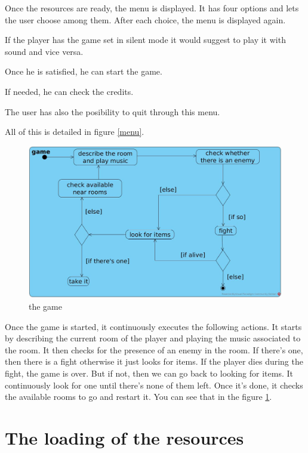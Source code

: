\documentclass[11pt]{extarticle}
\begin{document}
Once the resources are ready, the menu is displayed. It has four options and lets the user choose among them. After each choice, the menu is displayed again.

If the player has the game set in silent mode it would suggest to play it with sound and vice versa.

Once he is satisfied, he can start the game.

If needed, he can check the credits.

The user has also the posibility to quit through this menu. 

All of this is detailed in figure \ref{menu}.

\begin{figure}
    \centering
    
    \caption{the game}
    \label{game}
    \includegraphics[scale = 0.32]{game}
\end{figure}

\vspace{\baselineskip}

Once the game is started, it continuously executes the following actions. It starts by describing the current room of the player and playing the music associated to the room. It then checks for the presence of an enemy in the room. If there's one, then there is a fight otherwise it just looks for items. If the player dies during the fight, the game is over. But if not, then we can go back to looking for items. It continuously look for one until there's none of them left. Once it's done, it checks the available rooms to go and restart it. You can see that in the figure \ref{game}.

\section{The loading of the resources}
\end{document}
